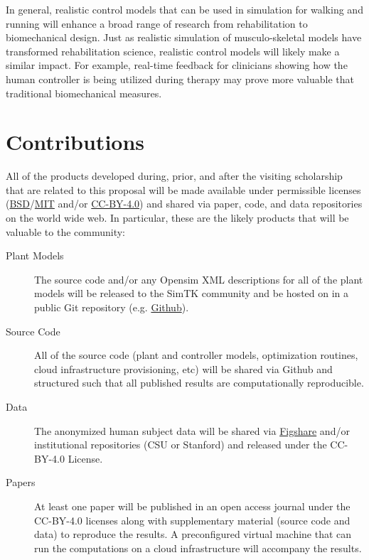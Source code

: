 \documentclass[11pt]{article}
\begin{document}
In general, realistic control models that can be used in simulation for walking
and running will enhance a broad range of research from rehabilitation to
biomechanical design. Just as realistic simulation of musculo-skeletal models
have transformed rehabilitation science, realistic control models will likely
make a similar impact. For example, real-time feedback for clinicians showing
how the human controller is being utilized during therapy may prove more
valuable that traditional biomechanical measures.

\section*{Contributions}

All of the products developed during, prior, and after the visiting scholarship
that are related to this proposal will be made available under permissible
licenses
(\href{http://opensource.org/licenses/BSD-2-Clause}{BSD}/\href{http://opensource.org/licenses/MIT}{MIT}
and/or \href{http://creativecommons.org/licenses/by/4.0/}{CC-BY-4.0}) and
shared via paper, code, and data repositories on the world wide web. In
particular, these are the likely products that will be valuable to the
community:

\begin{description}
  \item[Plant Models] The source code and/or any Opensim XML descriptions for
    all of the plant models will be released to the SimTK community and be
    hosted on in a public Git repository (e.g.
    \href{http://github.com}{Github}).
  \item[Source Code] All of the source code (plant and controller models,
    optimization routines, cloud infrastructure provisioning, etc) will be
    shared via Github and structured such that all published results are
    computationally reproducible.
  \item[Data] The anonymized human subject data will be shared via
    \href{http://figshare.com}{Figshare} and/or institutional repositories (CSU
    or Stanford) and released under the CC-BY-4.0 License.
  \item[Papers] At least one paper will be published in an open access journal
    under the CC-BY-4.0 licenses along with supplementary material (source code
    and data) to reproduce the results. A preconfigured virtual machine that
    can run the computations on a cloud infrastructure will accompany the
    results.
\end{description}
\end{document}
